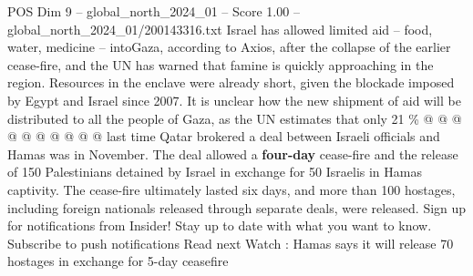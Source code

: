 \begin{textsample}{POS Dim 9 – global\_north\_2024\_01 – Score 1.00 – global\_north\_2024\_01/200143316.txt}
Israel has allowed limited aid -- food, water, medicine -- intoGaza, according to Axios, after the collapse of the earlier cease-fire, and the UN has warned that famine is quickly approaching in the region.
Resources in the enclave were already short, given the blockade imposed by Egypt and Israel since 2007.
It is unclear how the new shipment of aid will be distributed to all the people of Gaza, as the UN estimates that only 21 \% @ @ @ @ @ @ @ @ @ @ last time Qatar brokered a deal between Israeli officials and Hamas was in November.
The deal allowed a \textbf{four-day} cease-fire and the release of 150 Palestinians detained by Israel in exchange for 50 Israelis in Hamas captivity.
The cease-fire ultimately lasted six days, and more than 100 hostages, including foreign nationals released through separate deals, were released.
Sign up for notifications from Insider!
Stay up to date with what you want to know.
Subscribe to push notifications Read next Watch : Hamas says it will release 70 hostages in exchange for 5-day ceasefire

\end{textsample}
